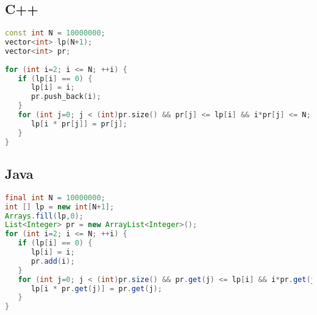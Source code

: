\subsection{C++}
\begin{lstlisting}[language=C++]
const int N = 10000000;
vector<int> lp(N+1);
vector<int> pr;
	
for (int i=2; i <= N; ++i) {
   if (lp[i] == 0) {
      lp[i] = i;
      pr.push_back(i);
   }
   for (int j=0; j < (int)pr.size() && pr[j] <= lp[i] && i*pr[j] <= N; ++j) {
      lp[i * pr[j]] = pr[j];
   }
}
\end{lstlisting}


\subsection{Java}
\begin{lstlisting}[language=Java]
final int N = 10000000;
int [] lp = new int[N+1];
Arrays.fill(lp,0);
List<Integer> pr = new ArrayList<Integer>();
for (int i=2; i <= N; ++i) {
   if (lp[i] == 0) {
      lp[i] = i;
      pr.add(i);
   }
   for (int j=0; j < (int)pr.size() && pr.get(j) <= lp[i] && i*pr.get(j) <= N; ++j) {
      lp[i * pr.get(j)] = pr.get(j);
   }
}
\end{lstlisting}